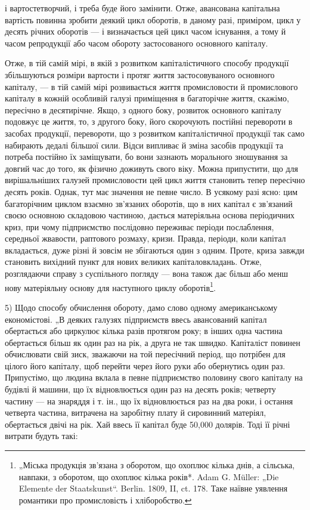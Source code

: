 \parcont{}  %
і вартостетворчий, і треба буде його замінити. Отже, авансована капітальна
вартість повинна зробити деякий цикл оборотів, в даному разі, приміром, цикл
у десять річних оборотів — і визначається цей цикл часом існування,
а тому й часом репродукції або часом обороту застосованого основного
капіталу.

Отже, в тій самій мірі, в якій з розвитком капіталістичного способу
продукції збільшуються розміри вартости і протяг життя застосовуваного
основного капіталу, — в тій самій мірі розвивається життя промисловости
й промислового капіталу в кожній особливій галузі приміщення в багаторічне
життя, скажімо, пересічно в десятирічне. Якщо, з одного боку,
розвиток основного капіталу подовжує це життя, то, з другого боку,
його скорочують постійні перевороти в засобах продукції, перевороти,
що з розвитком капіталістичної продукції так само набирають дедалі
більшої сили. Відси випливає й зміна засобів продукції та потреба постійно
їх заміщувати, бо вони зазнають морального зношування за довгий
час до того, як фізично доживуть свого віку. Можна припустити, що
для вирішальніших галузей промисловости цей цикл життя становить тепер
пересічно десять років. Однак, тут має значення не певне число. В усякому
разі ясно: цим багаторічним циклом взаємно зв’язаних оборотів, що
в них капітал є зв’язаний своєю основною складовою частиною, дається
матеріяльна основа періодичних криз, при чому підприємство послідовно
переживає періоди послаблення, середньої жвавости, раптового розмаху,
кризи. Правда, періоди, коли капітал вкладається, дуже різні й зовсім не
збігаються один з одним. Проте, криза завжди становить вихідний пункт
для нових великих капіталовкладань. Отже, розглядаючи справу з суспільного
погляду — вона також дає більш або менш нову матеріяльну
основу для наступного циклу оборотів\footnote{
„Міська продукція зв’язана з оборотом, що охоплює кілька днів, а сільська,
навпаки, з оборотом, що охоплює кілька років*. Adam G. Müller: „Die Elemente
der Staatskunst“. Berlin. 1809, II, ct. 178. Таке наївне уявлення романтики
про промисловість і хліборобство.
}.

5) Щодо способу обчислення обороту, дамо слово одному американському
економістові. „В деяких галузях підприємств ввесь авансований
капітал обертається або циркулює кілька разів протягом року; в інших
одна частина обертається більш як один раз на рік, а друга не так швидко.
Капіталіст повинен обчислювати свій зиск, зважаючи на той пересічний
період, що потрібен для цілого його капіталу, щоб перейти через його
руки або обернутись один раз. Припустімо, що людина вклала в певне
підприємство половину свого капіталу на будівлі й машини, що їх відновлюється
один раз на десять років; четверту частину — на знаряддя і т. ін.,
що їх відновлюється раз на два роки, і остання четверта частина, витрачена
на заробітну плату й сировинний матеріял, обертається двічі на рік.
Хай ввесь її капітал буде 50,000 долярів. Тоді її річні витрати будуть
такі:
